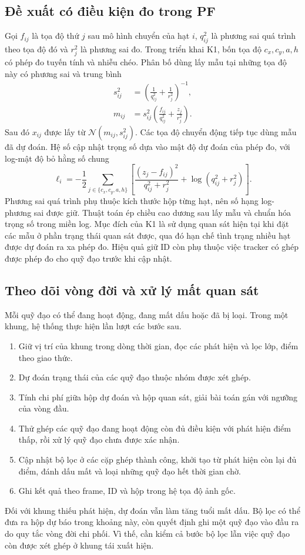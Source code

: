 \subsection{Đề xuất có điều kiện đo trong PF}
Gọi $f_{ij}$ là tọa độ thứ $j$ sau mô hình chuyển của hạt $i$, $q_{ij}^2$ là phương sai quá trình theo tọa độ đó và $r_j^2$ là phương sai đo. Trong triển khai K1, bốn tọa độ $c_x,c_y,a,h$ có phép đo tuyến tính và nhiễu chéo. Phân bố dùng lấy mẫu tại những tọa độ này có phương sai và trung bình
\begin{align}
 s_{ij}^{2}&=\left(\frac{1}{q_{ij}^{2}}+\frac{1}{r_j^{2}}\right)^{-1},\\
 m_{ij}&=s_{ij}^{2}\left(\frac{f_{ij}}{q_{ij}^{2}}+\frac{z_j}{r_j^{2}}\right).
\end{align}
Sau đó $x_{ij}$ được lấy từ $\mathcal{N}(m_{ij},s_{ij}^2)$. Các tọa độ chuyển động tiếp tục dùng mẫu đã dự đoán. Hệ số cập nhật trọng số dựa vào mật độ dự đoán của phép đo, với log-mật độ bỏ hằng số chung
\[
 \ell_i=-\frac12\sum_{j\in\{c_x,c_y,a,h\}}
 \left[\frac{(z_j-f_{ij})^2}{q_{ij}^2+r_j^2}
       +\log(q_{ij}^2+r_j^2)\right].
\]
Phương sai quá trình phụ thuộc kích thước hộp từng hạt, nên số hạng log-phương sai được giữ. Thuật toán ép chiều cao dương sau lấy mẫu và chuẩn hóa trọng số trong miền log. Mục đích của K1 là sử dụng quan sát hiện tại khi đặt các mẫu ở phần trạng thái quan sát được, qua đó hạn chế tình trạng nhiều hạt được dự đoán ra xa phép đo. Hiệu quả giữ ID còn phụ thuộc việc tracker có ghép được phép đo cho quỹ đạo trước khi cập nhật.

\subsection{Theo dõi vòng đời và xử lý mất quan sát}
Mỗi quỹ đạo có thể đang hoạt động, đang mất dấu hoặc đã bị loại. Trong một khung, hệ thống thực hiện lần lượt các bước sau.
\begin{enumerate}
\item Giữ vị trí của khung trong dòng thời gian, đọc các phát hiện và lọc lớp, điểm theo giao thức.
\item Dự đoán trạng thái của các quỹ đạo thuộc nhóm được xét ghép.
\item Tính chi phí giữa hộp dự đoán và hộp quan sát, giải bài toán gán với ngưỡng của vòng đầu.
\item Thử ghép các quỹ đạo đang hoạt động còn đủ điều kiện với phát hiện điểm thấp, rồi xử lý quỹ đạo chưa được xác nhận.
\item Cập nhật bộ lọc ở các cặp ghép thành công, khởi tạo từ phát hiện còn lại đủ điểm, đánh dấu mất và loại những quỹ đạo hết thời gian chờ.
\item Ghi kết quả theo frame, ID và hộp trong hệ tọa độ ảnh gốc.
\end{enumerate}
Đối với khung thiếu phát hiện, dự đoán vẫn làm tăng tuổi mất dấu. Bộ lọc có thể đưa ra hộp dự báo trong khoảng này, còn quyết định ghi một quỹ đạo vào đầu ra do quy tắc vòng đời chi phối. Vì thế, cần kiểm cả bước bộ lọc lẫn việc quỹ đạo còn được xét ghép ở khung tái xuất hiện.

